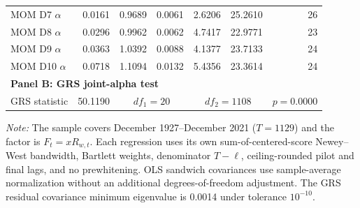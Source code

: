 \begin{table}[H]
\begin{minipage}{0.99\textwidth}
\begin{tabular*}{\linewidth}{@{\extracolsep{\fill}}lrrrrrr@{}}
      MOM D7 $\alpha$ & 0.0161 & 0.9689 & 0.0061 & 2.6206 & 25.2610 & 26 \\
      MOM D8 $\alpha$ & 0.0296 & 0.9962 & 0.0062 & 4.7417 & 22.9771 & 23 \\
      MOM D9 $\alpha$ & 0.0363 & 1.0392 & 0.0088 & 4.1377 & 23.7133 & 24 \\
      MOM D10 $\alpha$ & 0.0718 & 1.1094 & 0.0132 & 5.4356 & 23.3614 & 24 \\
      \midrule
      \multicolumn{7}{l}{\textbf{Panel B: GRS joint-alpha test}} \\
      GRS statistic & 50.1190 & \multicolumn{2}{c}{$df_1=20$} & \multicolumn{2}{c}{$df_2=1108$} & $p=0.0000$ \\
      \bottomrule
    \end{tabular*}

    \par\smallskip
    {\footnotesize\raggedright \textit{Note:} The sample covers December 1927--December 2021 ($T=1129$) and the factor is $F_t=xR_{w,t}$. Each regression uses its own sum-of-centered-score Newey--West bandwidth, Bartlett weights, denominator $T-\ell$, ceiling-rounded pilot and final lags, and no prewhitening. OLS sandwich covariances use sample-average normalization without an additional degrees-of-freedom adjustment. The GRS residual covariance minimum eigenvalue is 0.0014 under tolerance $10^{-10}$.\par}
  \end{minipage}
\end{table}
